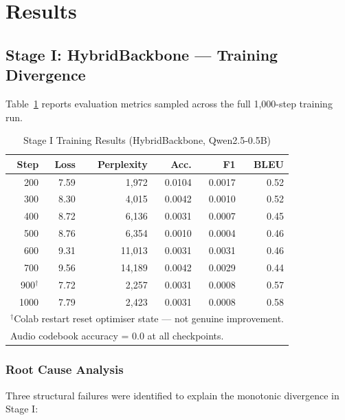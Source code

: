 \documentclass[conference]{IEEEtran}
\begin{document}
\section{Results}
\label{sec:results}

\subsection{Stage I: HybridBackbone --- Training Divergence}

Table~\ref{tab:stage1_results} reports evaluation metrics sampled across the
full 1,000-step training run.

\begin{table}[t]
\caption{Stage I Training Results (HybridBackbone, Qwen2.5-0.5B)}
\label{tab:stage1_results}
\centering
\small
\begin{tabular}{rrrrrr}
\toprule
\textbf{Step} & \textbf{Loss} & \textbf{Perplexity} & \textbf{Acc.} & \textbf{F1} & \textbf{BLEU} \\
\midrule
200  & 7.59 & 1{,}972  & 0.0104 & 0.0017 & 0.52 \\
300  & 8.30 & 4{,}015  & 0.0042 & 0.0010 & 0.52 \\
400  & 8.72 & 6{,}136  & 0.0031 & 0.0007 & 0.45 \\
500  & 8.76 & 6{,}354  & 0.0010 & 0.0004 & 0.46 \\
600  & 9.31 & 11{,}013 & 0.0031 & 0.0031 & 0.46 \\
700  & 9.56 & 14{,}189 & 0.0042 & 0.0029 & 0.44 \\
900$^\dagger$ & 7.72 & 2{,}257 & 0.0031 & 0.0008 & 0.57 \\
1000 & 7.79 & 2{,}423  & 0.0031 & 0.0008 & 0.58 \\
\midrule
\multicolumn{6}{l}{$^\dagger$Colab restart reset optimiser state — not genuine improvement.} \\
\multicolumn{6}{l}{Audio codebook accuracy = 0.0 at all checkpoints.} \\
\bottomrule
\end{tabular}
\end{table}

\subsubsection{Root Cause Analysis}

Three structural failures were identified to explain the monotonic divergence
in Stage I:
\end{document}
